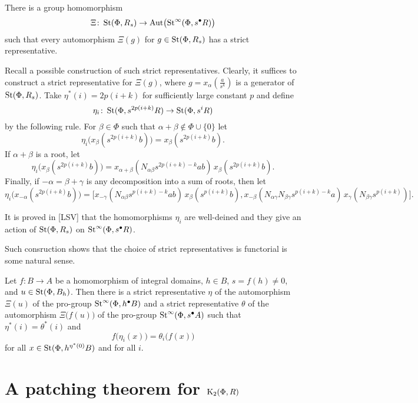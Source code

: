 \documentclass[oneside, 11pt]{amsart} \pdfoutput=1
\begin{document}
\begin{theorem}[Voronetsky]
\label{vor}
There is a group homomorphism 
$$
\Xi \colon \mathop{\mathrm{St}}\nolimits(\Phi, R_s) \to \mathrm{Aut}\bigl(\mathop{\mathrm{St}}\nolimits^\infty(\Phi, s^\bullet R)\bigr)
$$
such that every automorphism $\Xi(g)$ for $g \in \mathop{\mathrm{St}}\nolimits(\Phi, R_s)$ has a strict representative.
\end{theorem}

Recall a possible construction of such strict representatives. Clearly, it suffices to construct a strict representative for \(\Xi(g)\), where $g = x_\alpha(\frac a {s^k})$ is a generator of $\mathop{\mathrm{St}}\nolimits(\Phi, R_s)$. Take $\eta^*(i) = 2p(i + k)$ for sufficiently large constant \(p\) and define
$$
\eta_i \colon \mathop{\mathrm{St}}\nolimits(\Phi, s^{2p(i + k)} R) \to \mathop{\mathrm{St}}\nolimits(\Phi, s^i R)
$$
by the following rule. For $\beta \in \Phi$ such that \(\alpha + \beta \notin \Phi \cup \{0\}\) let 
$$\eta_i \bigl(x_\beta(s^{2p(i + k)} b)\bigr) = x_\beta(s^{2p(i + k)}b).$$
If $\alpha + \beta$ is a root, let
$$
\eta_i\bigl(x_\beta(s^{2p(i + k)} b)\bigr) = x_{\alpha + \beta}(N_{\alpha \beta} s^{2p(i + k) - k} ab)\, x_\beta(s^{2p(i + k)} b).
$$
Finally, if $-\alpha = \beta + \gamma$ is any decomposition into a sum of roots, then let
$$
\eta_i\bigl(x_{-\alpha}(s^{2p(i + k)} b)\bigr) = \bigl[x_{-\gamma}(N_{\alpha\beta} s^{p(i + k) - k} ab)\,
x_\beta(s^{p(i + k)} b),
x_{-\beta}(N_{\alpha\gamma} N_{\beta\gamma} s^{p(i + k) - k} a)\,
x_\gamma(N_{\beta \gamma} s^{p(i + k)})\bigr].
$$

It is proved in [LSV] that the homomorphisms $\eta_i$ are well-deined and they give an action of $\mathop{\mathrm{St}}\nolimits(\Phi, R_s)$ on $\mathop{\mathrm{St}}\nolimits^\infty(\Phi, s^\bullet R)$.

Such consruction shows that the choice of strict representatives is functorial is some natural sense. 
\begin{corollary}
\label{vorcor}
Let $f \colon B \to A$ be a homomorphism of integral domains, $h \in B$, $s = f(h) \neq 0$, and $u \in \mathop{\mathrm{St}}\nolimits(\Phi, B_h)$. Then there is a strict representative $\eta$ of the automorphism $\Xi(u)$ of the pro-group $\mathop{\mathrm{St}}\nolimits^\infty(\Phi, h^\bullet B)$ and a strict representative $\theta$ of the automorphism $\Xi\bigl(f(u)\bigr)$ of the pro-group $\mathop{\mathrm{St}}\nolimits^\infty(\Phi, s^\bullet A)$ such that $\eta^*(i) = \theta^*(i)$ and
$$f\bigl(\eta_i(x)\bigr) = \theta_i\bigl(f(x)\bigr)$$
for all $x \in \mathop{\mathrm{St}}\nolimits(\Phi, h^{\eta^*(0)}B)$ and for all \(i\).
\end{corollary}

\section{A patching theorem for \texorpdfstring{${\mathrm{K}}_2(\Phi, R)$}{K2(Ф,R)}}
\end{document}
